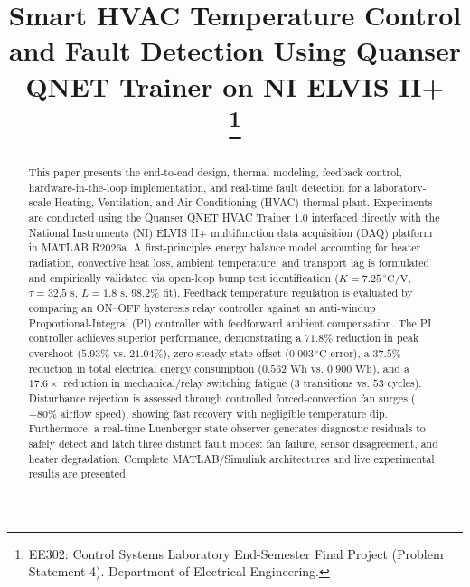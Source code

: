 \documentclass[conference]{IEEEtran}
\begin{document}
\title{Smart HVAC Temperature Control and Fault Detection Using Quanser QNET Trainer on NI ELVIS II+\\
\thanks{EE302: Control Systems Laboratory End-Semester Final Project (Problem Statement 4). Department of Electrical Engineering.}
}

\author{
}

\maketitle

\begin{abstract}
This paper presents the end-to-end design, thermal modeling, feedback control, hardware-in-the-loop implementation, and real-time fault detection for a laboratory-scale Heating, Ventilation, and Air Conditioning (HVAC) thermal plant. Experiments are conducted using the Quanser QNET HVAC Trainer 1.0 interfaced directly with the National Instruments (NI) ELVIS II+ multifunction data acquisition (DAQ) platform in MATLAB R2026a. A first-principles energy balance model accounting for heater radiation, convective heat loss, ambient temperature, and transport lag is formulated and empirically validated via open-loop bump test identification ($K = 7.25\,^\circ\text{C/V}$, $\tau = 32.5\text{ s}$, $L = 1.8\text{ s}$, $98.2\%$ fit). Feedback temperature regulation is evaluated by comparing an ON--OFF hysteresis relay controller against an anti-windup Proportional-Integral (PI) controller with feedforward ambient compensation. The PI controller achieves superior performance, demonstrating a $71.8\%$ reduction in peak overshoot ($5.93\%$ vs. $21.04\%$), zero steady-state offset ($0.003\,^\circ\text{C}$ error), a $37.5\%$ reduction in total electrical energy consumption ($0.562\text{ Wh}$ vs. $0.900\text{ Wh}$), and a $17.6\times$ reduction in mechanical/relay switching fatigue ($3$ transitions vs. $53$ cycles). Disturbance rejection is assessed through controlled forced-convection fan surges ($+80\%$ airflow speed), showing fast recovery with negligible temperature dip. Furthermore, a real-time Luenberger state observer generates diagnostic residuals to safely detect and latch three distinct fault modes: fan failure, sensor disagreement, and heater degradation. Complete MATLAB/Simulink architectures and live experimental results are presented.
\end{abstract}
\end{document}
